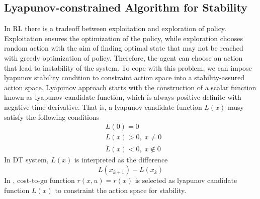 \documentclass[conference]{IEEEtran}
\begin{document}
\subsection{Lyapunov-constrained Algorithm for Stability}
In RL there is a tradeoff between exploitation and exploration of policy. Exploitation ensures the optimization of the policy, while exploration chooses random action with the aim of finding optimal state that may not be reached with greedy optimization of policy. Therefore, the agent can choose an action that lead to instability of the system. To cope with this problem, we can impose lyapunov stability condition to constraint action space into a stability-assured action space. Lyapunov approach starts with the construction of a scalar function known as lyapunov candidate function, which is always positive definite with negative time derivative. That is, a lyapunov candidate function \(L(x)\) musy satisfy the following conditions
\begin{equation}
\begin{aligned}
	& L(0) = 0 \quad \\
	& L(x) > 0, \; x \neq 0 \\
	& \dot{L}(x) < 0, \; x \notin 0
\end{aligned}
\end{equation}
In DT system, \(\dot{L}(x)\) is interpreted as the  difference
 \[L(x_{k+1}) - L(x_k)\]
In \cite{b7}, cost-to-go function \(r(x, u) = r(x)\) is selected as lyapunov candidate function \(L(x)\) to constraint the action space for stability.
\end{document}
